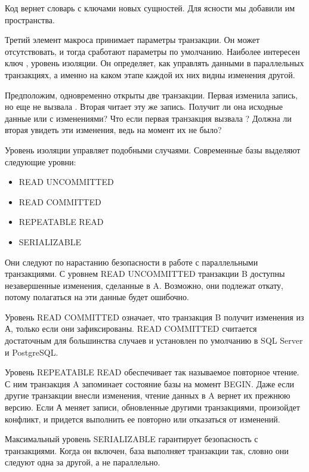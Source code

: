Код вернет словарь с ключами новых сущностей. Для ясности мы добавили им пространства.

Третий элемент макроса принимает параметры транзакции. Он может отсутствовать, и тогда сработают параметры по умолчанию. Наиболее интересен ключ , уровень изоляции. Он определяет, как управлять данными в параллельных транзакциях, а именно на каком этапе каждой их них видны изменения другой.

Предположим, одновременно открыты две транзакции. Первая изменила запись, но еще не вызвала . Вторая читает эту же запись. Получит ли она исходные данные или с изменениями? Что если первая транзакция вызвала ? Должна ли вторая увидеть эти изменения, ведь на момент  их не было?

Уровень изоляции управляет подобными случаями. Современные базы выделяют следующие уровни:

\begin{itemize}

\item
  READ UNCOMMITTED

\item
  READ COMMITTED

\item
  REPEATABLE READ

\item
  SERIALIZABLE

\end{itemize}

Они следуют по нарастанию безопасности в работе с параллельными транзакциями. С уровнем READ UNCOMMITTED транзакции B доступны незавершенные изменения, сделанные в A. Возможно, они подлежат откату, потому полагаться на эти данные будет ошибочно.

Уровень READ COMMITTED означает, что транзакция B получит изменения из А, только если они зафиксированы. READ COMMITTED считается достаточным для большинства случаев и установлен по умолчанию в SQL Server и PostgreSQL.

Уровень REPEATABLE READ обеспечивает так называемое повторное чтение. С ним транзакция A запоминает состояние базы на момент BEGIN. Даже если другие транзакции внесли изменения, чтение данных в A вернет их прежнюю версию. Если А меняет записи, обновленные другими транзакциями, произойдет конфликт, и придется выполнить ее повторно или отказаться от изменений.

Максимальный уровень SERIALIZABLE гарантирует безопасность с транзакциями. Когда он включен, база выполняет транзакции так, словно они следуют одна за другой, а не параллельно.

